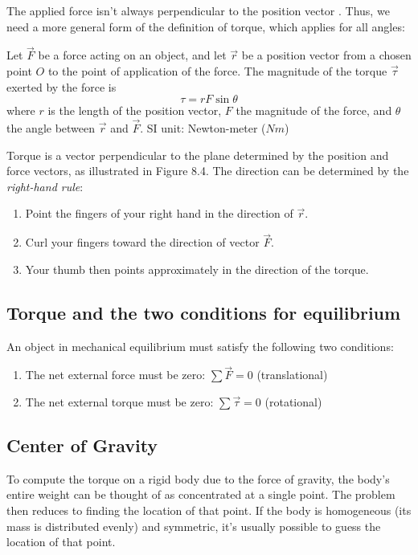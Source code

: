 The applied force isn't always perpendicular to the position vector . Thus, we need a more general form of the definition of torque, which applies for all angles:
 
\begin{defi}
Let $\vec{F}$ be a force acting on an object, and let $\vec{r}$ be a position vector from a chosen point $O$ to the point of application of the force. The magnitude of the torque $\vec{\tau}$ exerted by the force is
$$\tau = rF\sin \theta$$
where $r$ is the length of the position vector, $F$ the magnitude of the force, and $\theta$ the angle between $\vec{r}$ and $\vec{F}$.
SI unit: Newton-meter ($N m$)
\end{defi}

Torque is a vector perpendicular to the plane determined by the position and force vectors, as illustrated in Figure 8.4. The direction can be determined by the \textit{right-hand rule}:
\begin{enumerate}
\item Point the fingers of your right hand in the direction of $\vec{r}$.
\item Curl your fingers toward the direction of vector $\vec{F}$.
\item Your thumb then points approximately in the direction of the torque.
\end{enumerate}


\subsection{Torque and the two conditions for equilibrium}
\begin{form}
An object in mechanical equilibrium must satisfy the following two conditions:
\begin{enumerate}
\item The net external force must be zero: $\sum{\vec{F}} = 0$ (translational)
\item The net external torque must be zero: $\sum{\vec{\tau}} = 0$ (rotational)
\end{enumerate}
\end{form}

\subsection{Center of Gravity}
To compute the torque on a rigid body due to the force of gravity, the body's entire weight can be thought of as
concentrated at a single point. The problem then reduces to finding the location of that point. If the body is homogeneous (its mass is distributed evenly) and symmetric, it's usually possible to guess the location of that point.

